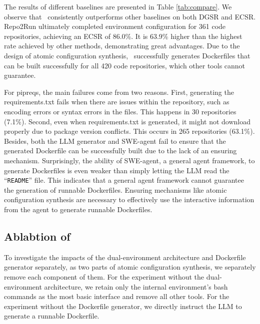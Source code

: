 The results of different baselines are presented in Table \ref{tab:compare}. We observe that \tool~consistently outperforms other baselines on both DGSR and ECSR. Repo2Run ultimately completed environment configuration for 361 code repositories, achieving an ECSR of 86.0\%. It is 63.9\% higher than the highest rate achieved by other methods,  demonstrating great advantages.
Due to the design of atomic configuration synthesis, \tool~successfully generates Dockerfiles that can be built successfully for all 420 code repositories, which other tools cannot guarantee.

For pipreqs, the main failures come from two reasons. First, generating the requirements.txt fails when there are issues within the repository, such as encoding errors or syntax errors in the files. This happens in 30 repositories (7.1\%). Second, even when requirements.txt is generated, it might not download properly due to package version conflicts. This occurs in 265 repositories (63.1\%). Besides, both the LLM generator and SWE-agent fail to ensure that the generated Dockerfile can be successfully built due to the lack of an ensuring mechanism. Surprisingly, the ability of SWE-agent, a general agent framework, to generate Dockerfiles is even weaker than simply letting the LLM read the ``\texttt{README}'' file. This indicates that a general agent framework cannot guarantee the generation of runnable Dockerfiles. Ensuring mechanisms like atomic configuration synthesis are necessary to effectively use the interactive information from the agent to generate runnable Dockerfiles.




\subsection{Ablabtion of~\tool}


To investigate the impacts of the dual-environment architecture and Dockerfile generator separately, as two parts of atomic configuration synthesis, we separately remove each component of them. For the experiment without the dual-environment architecture, we retain only the internal environment's bash commands as the most basic interface and remove all other tools. For the experiment without the Dockerfile generator, we directly instruct the LLM to generate a runnable Dockerfile. 

